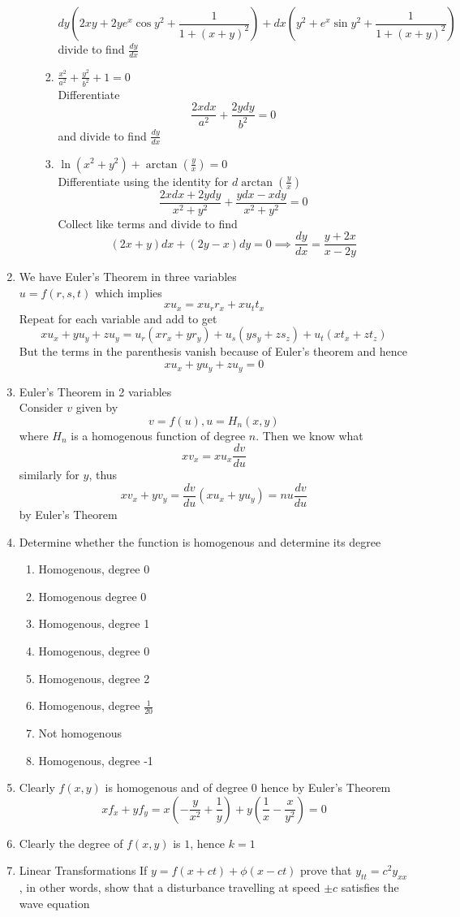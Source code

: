 \documentclass[12pt]{article}
\begin{document}
\begin{enumerate}
\begin{enumerate}
\begin{enumerate}
$$
dy\left( 2xy + 2ye^{ x }\cos y^{2} + \frac{1}{1 + (x+y)^{2}} \right) + dx\left( y^{2} + e^{ x  }\sin y^{2} + \frac{1}{1 + (x + y)^{2}} \right)
$$
divide to find $\frac{dy}{dx}$
\item $\frac{x^{2}}{a^{2}} + \frac{y^{2}}{b^{2}} + 1=0$ \\
Differentiate
$$
\frac{2xdx}{a^{2}} + \frac{2ydy}{b^{2}} = 0
$$
and divide to find $\frac{dy}{dx}$
\item $\ln(x^{2} + y^{2}) + \arctan\left( \frac{y}{x} \right) =0$ \\
Differentiate using the identity for $d \arctan\left( \frac{y}{x} \right)$
$$
\frac{2xdx + 2ydy}{x^{2} + y^{2}} + \frac{ydx-xdy}{x^{2} + y^{2}} = 0
$$
Collect like terms and divide to find
$$
(2x + y)dx + (2y-x)dy = 0 \implies \frac{dy}{dx} = \frac{y + 2x}{x-2y}
$$
\end{enumerate}
\end{enumerate}
\item We have Euler's Theorem in three variables
\\ $u = f(r,s,t)$ which implies
$$
xu_{x} = xu_{r}r_{x} + xu_{t}t_{x} 
$$
Repeat for each variable and add to get
$$
xu_{x } + yu_{y} + zu_{y} =u_{r}(xr_{x} + yr_{y} ) + u_{s} (ys_{y} + zs_{z}) + u_{t}(xt_{x} + zt_{z})
$$
But the terms in the parenthesis vanish because of Euler's theorem and hence 
$$
xu_{x} + yu_{y} + zu_{y} = 0
$$
\item Euler's Theorem in 2 variables \\
Consider $v$ given by
$$
v = f(u), u = H_{n}(x,y)
$$
where $H_{n}$ is a homogenous function of degree $n$. Then we know what
$$
xv_{x} = xu_{x} \frac{dv}{du}
$$
similarly for $y$, thus
$$
\boxed{
xv_{x} + yv_{y} = \frac{dv}{du}(xu_{x} + yu_{y}) =nu \frac{ dv}{du}
}
$$
by Euler's Theorem
\item Determine whether the function is homogenous and determine its degree
\begin{enumerate}
\item Homogenous, degree 0
\item Homogenous degree 0
\item Homogenous, degree 1
\item Homogenous, degree 0
\item Homogenous, degree 2
\item Homogenous, degree $\frac{1}{20}$
\item Not homogenous
\item Homogenous, degree -1
\end{enumerate}
\item 
Clearly $f(x,y)$ is homogenous and of degree $0$ hence by Euler's Theorem
$$
xf_{x} + yf_{y} = x\left( -\frac{y}{x^{2}} + \frac{1}{y} \right) + y\left( \frac{1}{x}-\frac{x}{y^{2}} \right) = 0
$$
\item
Clearly the degree of $f(x,y)$ is $1$, hence $k=1$
\item Linear Transformations
If $y = f(x + ct) + \phi(x-ct)$ prove that $y_{tt} = c^{2} y_{xx}$, in other words, show that a disturbance travelling at speed $\pm c$ satisfies the wave equation


\end{enumerate}
\end{document}
